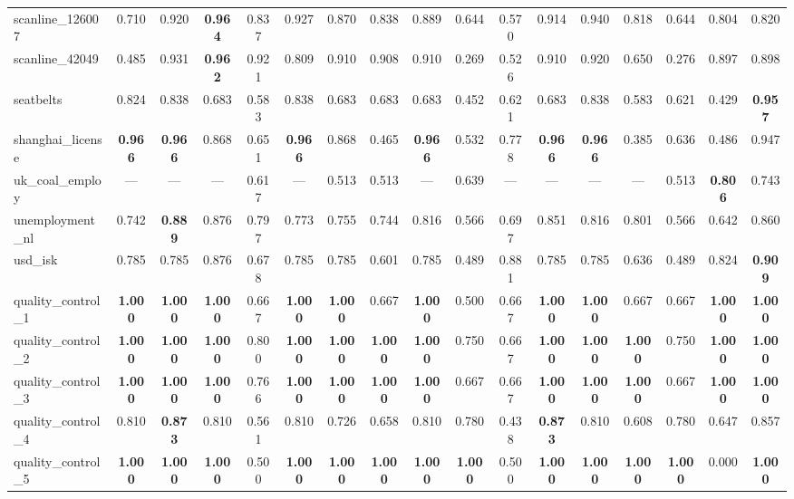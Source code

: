 \documentclass[11pt,a4paper]{article}
\begin{document}
\begin{table}
{\begin{tabular}{lcccccccccccccccc}
scanline\_126007 & 0.710 & 0.920 & \textbf{0.964} & 0.837 & 0.927 & 0.870 & 0.838 & 0.889 & 0.644 & 0.570 & 0.914 & 0.940 & 0.818 & 0.644 & 0.804 & 0.820 \\
scanline\_42049 & 0.485 & 0.931 & \textbf{0.962} & 0.921 & 0.809 & 0.910 & 0.908 & 0.910 & 0.269 & 0.526 & 0.910 & 0.920 & 0.650 & 0.276 & 0.897 & 0.898 \\
seatbelts & 0.824 & 0.838 & 0.683 & 0.583 & 0.838 & 0.683 & 0.683 & 0.683 & 0.452 & 0.621 & 0.683 & 0.838 & 0.583 & 0.621 & 0.429 & \textbf{0.957} \\
shanghai\_license & \textbf{0.966} & \textbf{0.966} & 0.868 & 0.651 & \textbf{0.966} & 0.868 & 0.465 & \textbf{0.966} & 0.532 & 0.778 & \textbf{0.966} & \textbf{0.966} & 0.385 & 0.636 & 0.486 & 0.947 \\
uk\_coal\_employ & — & — & — & 0.617 & — & 0.513 & 0.513 & — & 0.639 & — & — & — & — & 0.513 & \textbf{0.806} & 0.743 \\
unemployment\_nl & 0.742 & \textbf{0.889} & 0.876 & 0.797 & 0.773 & 0.755 & 0.744 & 0.816 & 0.566 & 0.697 & 0.851 & 0.816 & 0.801 & 0.566 & 0.642 & 0.860 \\
usd\_isk & 0.785 & 0.785 & 0.876 & 0.678 & 0.785 & 0.785 & 0.601 & 0.785 & 0.489 & 0.881 & 0.785 & 0.785 & 0.636 & 0.489 & 0.824 & \textbf{0.909} \\
quality\_control\_1 & \textbf{1.000} & \textbf{1.000} & \textbf{1.000} & 0.667 & \textbf{1.000} & \textbf{1.000} & 0.667 & \textbf{1.000} & 0.500 & 0.667 & \textbf{1.000} & \textbf{1.000} & 0.667 & 0.667 & \textbf{1.000} & \textbf{1.000} \\
quality\_control\_2 & \textbf{1.000} & \textbf{1.000} & \textbf{1.000} & 0.800 & \textbf{1.000} & \textbf{1.000} & \textbf{1.000} & \textbf{1.000} & 0.750 & 0.667 & \textbf{1.000} & \textbf{1.000} & \textbf{1.000} & 0.750 & \textbf{1.000} & \textbf{1.000} \\
quality\_control\_3 & \textbf{1.000} & \textbf{1.000} & \textbf{1.000} & 0.766 & \textbf{1.000} & \textbf{1.000} & \textbf{1.000} & \textbf{1.000} & 0.667 & 0.667 & \textbf{1.000} & \textbf{1.000} & \textbf{1.000} & 0.667 & \textbf{1.000} & \textbf{1.000} \\
quality\_control\_4 & 0.810 & \textbf{0.873} & 0.810 & 0.561 & 0.810 & 0.726 & 0.658 & 0.810 & 0.780 & 0.438 & \textbf{0.873} & 0.810 & 0.608 & 0.780 & 0.647 & 0.857 \\
quality\_control\_5 & \textbf{1.000} & \textbf{1.000} & \textbf{1.000} & 0.500 & \textbf{1.000} & \textbf{1.000} & \textbf{1.000} & \textbf{1.000} & \textbf{1.000} & 0.500 & \textbf{1.000} & \textbf{1.000} & \textbf{1.000} & \textbf{1.000} & 0.000 & \textbf{1.000} \\

\end{tabular}}
\end{table}
\end{document}
